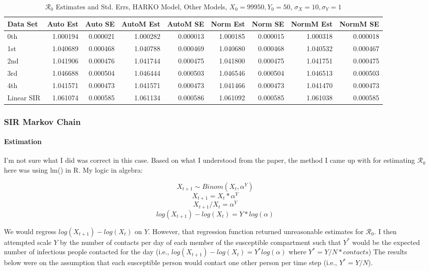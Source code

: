\documentclass[12pt]{article}
\newcommand{\rr}{\ensuremath{\mathcal{R}_0}}
\begin{document}
\begin{table}[H]
	
	\caption{$\rr$ Estimates and Std. Errs, HARKO Model,
		Other Models, $X_0 = 99950, Y_0 = 50$, 
		$\sigma_X = 10, \sigma_Y = 1$}
	\begin{footnotesize}
		\hskip -1cm
		\begin{tabular}{l|r|r|r|r|r|r|r|r}
			\hline
			Data Set & Auto Est & Auto SE & AutoM Est & AutoM SE & Norm Est & Norm SE & NormM Est & NormM SE\\
			\hline
			0th & 1.000194 & 0.000021  & 1.000282 & 0.000013 & 1.000185 & 0.000015 & 1.000318 & 0.000018\\
			\hline
			1st & 1.040689 & 0.000468 & 1.040788 & 0.000469 & 1.040680 & 0.000468 & 1.040532 & 0.000467\\
			\hline
			2nd & 1.041906 & 0.000476 & 1.041744 & 0.000475 & 1.041800 & 0.000475 & 1.041751 & 0.000475\\
			\hline
			3rd & 1.046688 & 0.000504 & 1.046444 & 0.000503 & 1.046546 & 0.000504 & 1.046513 & 0.000503\\
			\hline
			4th & 1.041571 & 0.000473 & 1.041571 & 0.000473 & 1.041466 & 0.000473 & 1.041470 & 0.000473\\
			\hline
			Linear SIR & 1.061074 & 0.000585 & 1.061134 & 0.000586 & 1.061092 & 0.000585 & 1.061038 & 0.000585\\
			\hline
		\end{tabular}
	\end{footnotesize}
\end{table}

\subsubsection{SIR Markov Chain}

\paragraph{Estimation}

I'm not sure what I did was correct in this case. Based on what I understood from the paper, the method I came up with for estimating $\rr$ here was using lm() in R. My logic in algebra:

$$X_{t+1} \sim Binom(X_{t}, \alpha^Y)$$ $$ X_{t+1} = X_{t} * \alpha^Y$$ $$X _{t+1} / X_{t} = \alpha^Y$$ $$log(X _{t+1}) - log(X_{t}) = Y * log(\alpha)$$

We would regress $log(X _{t+1}) - log(X_{t})$ on $Y$. However, that regression function returned unreasonable estimates for $\rr$. I then attempted scale $Y$ by the number of contacts per day of each member of the susceptible compartment such that $Y^*$ would be the expected number of infectious people contacted for the day (i.e., $log(X _{t+1}) - log(X_{t}) = Y^* log(\alpha)$ where $Y^* = Y/N * contacts$) The results below were on the assumption that each susceptible person would contact one other person per time step (i.e., $Y^* = Y/N$).
\end{document}
